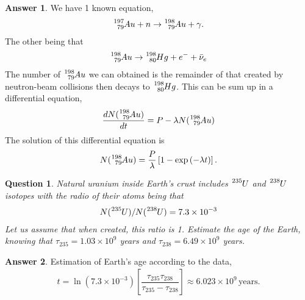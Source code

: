 \documentclass[12pt]{paper}
\numberwithin{equation}{section}
\newtheorem{question}{Question}
\theoremstyle{definition}
\newtheorem*{answer}{Answer}
\numberwithin{equation}{section}
\begin{document}
\begin{answer}
    We have 1 known equation,
    \begin{align} 
        \ce{^197_79}Au + n \rightarrow \ce{^198_79}Au + \gamma.
    \end{align}
    The other being that 
    \begin{align} 
        \ce{^198_79}Au \rightarrow \ce{^198_80}Hg + e^- + \bar{\nu}_e
    \end{align}
    The number of $\ce{^198_79}Au$ we can obtained is the remainder of that created by neutron-beam collisions then decays to $\ce{^198_80}Hg$. This can be sum up in a differential equation,
    \begin{align} 
        \dfrac{dN(\ce{^198_79}Au)}{dt} = P - \lambda N(\ce{^198_79}Au)
    \end{align}
    The solution of this differential equation is 
    \begin{align} 
        N(\ce{^198_79}Au) = \dfrac{P}{\lambda}\left[1 - \exp\left(-\lambda t\right)\right].
    \end{align}
\end{answer}
\begin{question}
    Natural uranium inside Earth's crust includes $\ce{^235}U$ and $\ce{^238}U$ isotopes with the radio of their atoms being that 
    \begin{align} 
        N(\ce{^235}U)/N(\ce{^238}U) = 7.3\times 10^{-3}
    \end{align}
    Let us assume that when created, this ratio is 1. Estimate the age of the Earth, knowing that $\tau_{235} = 1.03\times 10^9$ years and $\tau_{238}=6.49\times 10^9$ years.
\end{question}
\begin{answer}
    Estimation of Earth's age according to the data,
    \begin{align} 
        t = \ln(7.3\times 10^{-3})\left[\dfrac{\tau_{235}\tau_{238}}{\tau_{235}-\tau_{238}}\right]\approx 6.023\times 10^9\,\text{years}.
    \end{align}
\end{answer}
\end{document}
